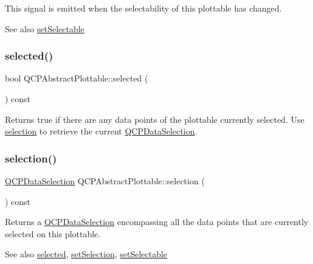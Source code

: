 This signal is emitted when the selectability of this plottable has changed.

\begin{DoxySeeAlso}{See also}
\hyperlink{classQCPAbstractPlottable_ac238d6e910f976f1f30d41c2bca44ac3}{set\+Selectable} 
\end{DoxySeeAlso}
\mbox{\label{classQCPAbstractPlottable_a0b3b514474fe93354fc74cfc144184b4}} 
\subsubsection{\texorpdfstring{selected()}{selected()}}
{\footnotesize\ttfamily bool Q\+C\+P\+Abstract\+Plottable\+::selected (\begin{DoxyParamCaption}{ }\end{DoxyParamCaption}) const\hspace{0.3cm}{\ttfamily [inline]}}

Returns true if there are any data points of the plottable currently selected. Use \hyperlink{classQCPAbstractPlottable_a040bf09f41d456284cfd39cc37aa068f}{selection} to retrieve the current \hyperlink{classQCPDataSelection}{Q\+C\+P\+Data\+Selection}. \mbox{\label{classQCPAbstractPlottable_a040bf09f41d456284cfd39cc37aa068f}} 
\subsubsection{\texorpdfstring{selection()}{selection()}}
{\footnotesize\ttfamily \hyperlink{classQCPDataSelection}{Q\+C\+P\+Data\+Selection} Q\+C\+P\+Abstract\+Plottable\+::selection (\begin{DoxyParamCaption}{ }\end{DoxyParamCaption}) const\hspace{0.3cm}{\ttfamily [inline]}}

Returns a \hyperlink{classQCPDataSelection}{Q\+C\+P\+Data\+Selection} encompassing all the data points that are currently selected on this plottable.

\begin{DoxySeeAlso}{See also}
\hyperlink{classQCPAbstractPlottable_a0b3b514474fe93354fc74cfc144184b4}{selected}, \hyperlink{classQCPAbstractPlottable_a219bc5403a9d85d3129165ec3f5ae436}{set\+Selection}, \hyperlink{classQCPAbstractPlottable_ac238d6e910f976f1f30d41c2bca44ac3}{set\+Selectable} 
\end{DoxySeeAlso}
\mbox{\label{classQCPAbstractPlottable_a3af66432b1dca93b28e00e78a8c7c1d9}} 
